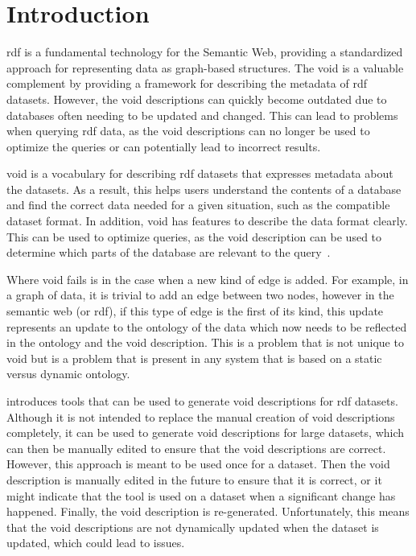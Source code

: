 \section{Introduction}\label{sec:introduction2}

\gls{rdf} is a fundamental technology for the Semantic Web, providing a standardized approach for representing data as graph-based structures. The \gls{void} is a valuable complement by providing a framework for describing the metadata of \gls{rdf} datasets. However, the \gls{void} descriptions can quickly become outdated due to databases often needing to be updated and changed. This can lead to problems when querying \gls{rdf} data, as the \gls{void} descriptions can no longer be used to optimize the queries or can potentially lead to incorrect results.

\gls{void} is a vocabulary for describing \gls{rdf} datasets that expresses metadata about the datasets. As a result, this helps users understand the contents of a database and find the correct data needed for a given situation, such as the compatible dataset format. In addition, \gls{void} has features to describe the data format clearly. This can be used to optimize queries, as the \gls{void} description can be used to determine which parts of the database are relevant to the query~\cite{documentation-void}.

Where \gls{void} fails is in the case when a new kind of edge is added. For example, in a graph of data, it is trivial to add an edge between two nodes, however in the semantic web (or \gls{rdf}), if this type of edge is the first of its kind, this update represents an update to the ontology of the data which now needs to be reflected in the ontology and the \gls{void} description. This is a problem that is not unique to \gls{void} but is a problem that is present in any system that is based on a static versus dynamic ontology. 

\cite{creating-void-descriptions} introduces tools that can be used to generate \gls{void} descriptions for \gls{rdf} datasets. Although it is not intended to replace the manual creation of \gls{void} descriptions completely, it can be used to generate \gls{void} descriptions for large datasets, which can then be manually edited to ensure that the \gls{void} descriptions are correct. However, this approach is meant to be used once for a dataset. Then the \gls{void} description is manually edited in the future to ensure that it is correct, or it might indicate that the tool is used on a dataset when a significant change has happened. Finally, the \gls{void} description is re-generated. Unfortunately, this means that the \gls{void} descriptions are not dynamically updated when the dataset is updated, which could lead to issues. 

